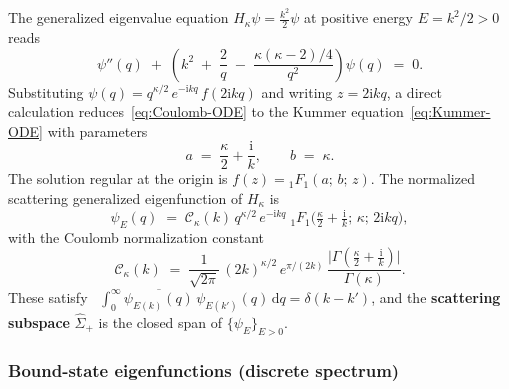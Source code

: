 \documentclass[11pt]{article}
\theoremstyle{plain}
\theoremstyle{definition}
\theoremstyle{remark}
\newcommand{\Sigmah}{\widehat{\Sigma}}
\newcommand{\ii}{\mathrm{i}}
\begin{document}
The generalized eigenvalue equation $H_{\kappa}\psi=\frac{k^{2}}{2}\psi$ at positive
energy $E=k^{2}/2>0$ reads
\begin{equation}\label{eq:Coulomb-ODE}
  \psi''(q)\;+\;\left(k^{2}\;+\;\frac{2}{q}\;-\;\frac{\kappa(\kappa-2)/4}{q^{2}}\right)\psi(q)\;=\;0.
\end{equation}
Substituting $\psi(q)=q^{\kappa/2}\,e^{-\ii kq}\,f(2\ii kq)$ and writing
$z=2\ii kq$, a direct calculation reduces~\eqref{eq:Coulomb-ODE} to the
Kummer equation~\eqref{eq:Kummer-ODE} with parameters
\[
  a\;=\;\frac{\kappa}{2}+\frac{\ii}{k},\qquad b\;=\;\kappa.
\]
The solution regular at the origin is $f(z)={}_{1}F_{1}(a;\,b;\,z)$.
The normalized scattering generalized eigenfunction of $H_{\kappa}$ is
\begin{equation}\label{eq:psi-E-Coulomb}
  \psi_{E}(q)\;=\;\mathcal{C}_{\kappa}(k)\,q^{\kappa/2}\,e^{-\ii kq}\;
    {}_{1}F_{1}\!\bigl(\tfrac{\kappa}{2}+\tfrac{\ii}{k};\,\kappa;\,2\ii kq\bigr),
\end{equation}
with the Coulomb normalization constant
\begin{equation}\label{eq:Coulomb-norm}
  \mathcal{C}_{\kappa}(k)\;=\;\frac{1}{\sqrt{2\pi}}\,(2k)^{\kappa/2}\,
    e^{\pi/(2k)}\,\frac{\bigl|\Gamma(\tfrac{\kappa}{2}+\tfrac{\ii}{k})\bigr|}{\Gamma(\kappa)}.
\end{equation}
These satisfy~\cite[Ch.~33]{DLMF}
$\int_{0}^{\infty}\overline{\psi_{E(k)}(q)}\,\psi_{E(k')}(q)\,\mathrm{d}q
=\delta(k-k')$, and the \textbf{scattering subspace} $\Sigmah_{+}$ is
the closed span of $\{\psi_{E}\}_{E>0}$.

\subsubsection*{Bound-state eigenfunctions (discrete spectrum)}
\end{document}
